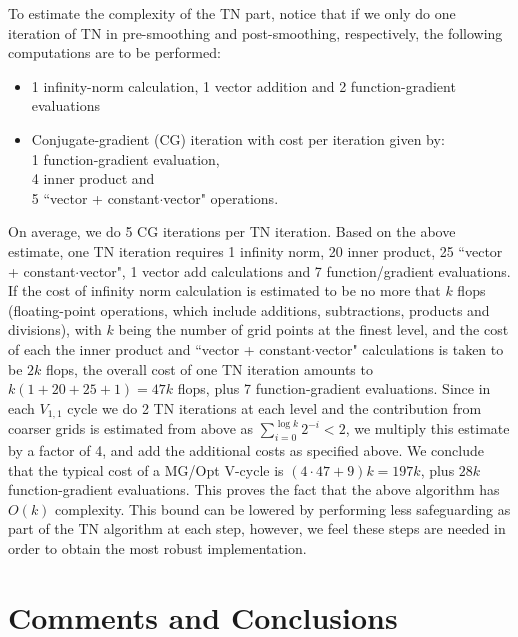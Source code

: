 \documentclass{siamltex}
\begin{document}
To estimate the complexity of the TN part, notice that if we only do one iteration of TN in pre-smoothing and post-smoothing, respectively, the following computations are to be performed:
\begin{itemize}
\item 1 infinity-norm calculation,  1 vector addition and 2 function-gradient evaluations
\item Conjugate-gradient (CG) iteration with cost per iteration given by:  \\1 function-gradient evaluation, \\4 inner product and \\5 ``vector + constant$\cdot$vector" operations.
\end{itemize}
 On average, we do 5 CG iterations per TN iteration.  Based on the above estimate, one TN iteration requires 1 infinity norm, 20 inner product, 25 ``vector + constant$\cdot$vector", 1 vector add calculations and 7 function/gradient evaluations. If the cost of infinity norm calculation is estimated to be no more that $k$ flops (floating-point operations, which include additions, subtractions, products and divisions), with $k$ being the number of grid points at the finest level, and the cost of each the inner product and ``vector + constant$\cdot$vector" calculations  is taken to be $2k$ flops, the overall cost of one TN iteration amounts to $ k (1 + 20 + 25 +1) = 47k$ flops, plus 7 function-gradient evaluations. Since in each $V_{1,1}$ cycle we do 2 TN iterations at each level and the contribution from coarser grids is estimated from above as $\sum^{\log k}_{i=0}{{2}^{-i}<2}$, we multiply this estimate by a factor of 4, and add the additional costs as specified above. We conclude that the typical cost of a MG/Opt V-cycle is $(4\cdot 47+9)k=197k$, plus $28k$ function-gradient evaluations.  This proves the fact that the above algorithm has $O(k)$ complexity. This bound can be lowered by performing less safeguarding as part of the TN algorithm at each step, however, we feel these steps are needed in order to obtain the most robust implementation.

\section{Comments and Conclusions}
\end{document}
